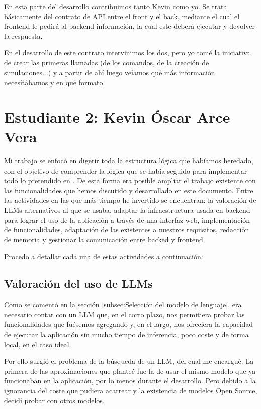 En esta parte del desarrollo contribuimos tanto Kevin como yo. Se trata básicamente del contrato de API entre el front y el back, mediante el cual el frontend le pedirá al backend información, la cual este deberá ejecutar y devolver la respuesta.

En el desarrollo de este contrato intervinimos los dos, pero yo tomé la iniciativa de crear las primeras llamadas (de los comandos, de la creación de simulaciones...) y a partir de ahí luego veíamos qué más información necesitábamos y en qué formato.

\section*{Estudiante 2: Kevin Óscar Arce Vera}

Mi trabajo se enfocó en digerir toda la estructura lógica que habíamos heredado, con el objetivo de comprender la lógica que se había seguido para implementar todo lo pretendido en \cite{park2023generative}. De esta forma era posible ampliar el trabajo existente con las funcionalidades que hemos discutido y desarrollado en este documento. Entre las actividades en las que más tiempo he invertido se encuentran: la valoración de  LLMs alternativos al que se usaba,  adaptar la infraestructura usada en backend para lograr el uso de la aplicación a través de una interfaz web, implementación de funcionalidades, adaptación de las existentes a nuestros requisitos, redacción de memoria y gestionar la comunicación entre backed y frontend.

Procedo a detallar cada una de estas actividades a continuación:

\subsection*{Valoración del uso de LLMs}

Como se comentó en la sección \ref{subsec:Selección del modelo de lenguaje}, era necesario contar con un LLM que, en el corto plazo, nos permitiera probar las funcionalidades que fuésemos agregando y, en el largo, nos ofreciera la capacidad de ejecutar la aplicación sin mucho tiempo de inferencia, poco coste y de forma local, en el caso ideal.

Por ello surgió el problema de la búsqueda de un LLM, del cual me encargué. La primera de las aproximaciones que planteé fue la de usar el mismo modelo que ya funcionaban en la aplicación, por lo menos durante el desarrollo. Pero debido a la ignorancia del coste que pudiera acarrear y la existencia de modelos Open Source, decidí probar con otros modelos.

